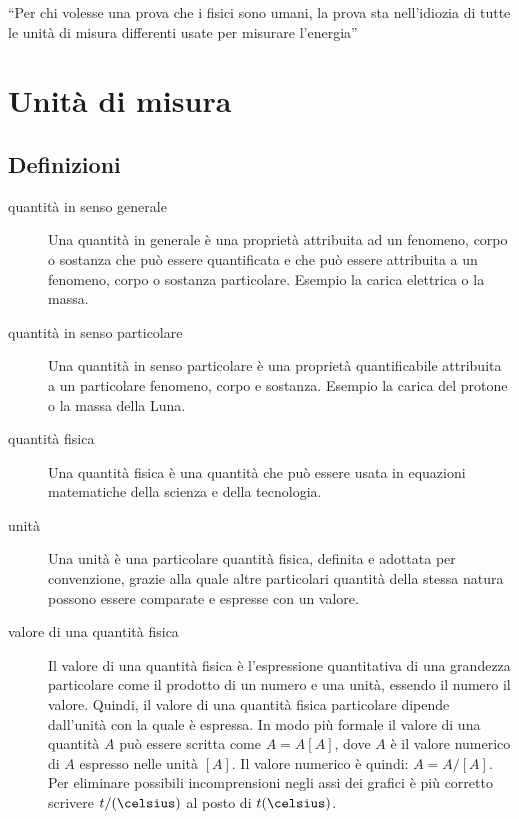 \begin{savequote}[6cm]
``Per chi volesse una prova che i fisici sono umani, la prova sta nell'idiozia di tutte le unità di misura differenti usate per misurare l'energia''
\end{savequote}
\chapter{Unità di misura\label{unita_di_misura_appendice}}
\section{Definizioni}
\begin{description}
\item[quantità in senso generale] Una quantità in generale è una proprietà attribuita ad un fenomeno, corpo o sostanza che può essere quantificata e che può essere attribuita a un fenomeno, corpo o sostanza particolare. Esempio la carica elettrica o la massa.
\item[quantità in senso particolare] Una quantità in senso particolare è una proprietà quantificabile attribuita a un particolare fenomeno, corpo e sostanza. Esempio la carica del protone o la massa della Luna.
\item[quantità fisica] Una quantità fisica è una quantità che può essere usata in equazioni matematiche della scienza e della tecnologia.
\item[unità] Una unità è una particolare quantità fisica, definita e adottata per convenzione, grazie alla quale altre particolari quantità della stessa natura possono essere comparate e espresse con un valore.
\item[valore di una quantità fisica] Il valore di una quantità fisica è l'espressione quantitativa di una grandezza particolare come il prodotto di un numero e una unità, essendo il numero il valore. Quindi, il valore di una quantità fisica particolare dipende dall'unità con la quale è espressa. In modo più formale il valore di una quantità $A$ può essere scritta come $A={A}[A]$, dove ${A}$ è il valore numerico di $A$ espresso nelle unità $[A]$. Il valore numerico è quindi: ${A}=A/[A]$. Per eliminare possibili incomprensioni negli assi dei grafici è più corretto scrivere $t/(\celsius)$ al posto di $t(\celsius)$.
\end{description}
